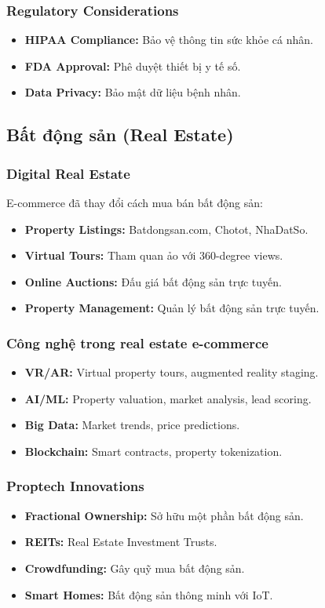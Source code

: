 \documentclass[a4paper,12pt]{report}
\begin{document}
\subsubsection{Regulatory Considerations}
\begin{itemize}
    \item \textbf{HIPAA Compliance:} Bảo vệ thông tin sức khỏe cá nhân.
    \item \textbf{FDA Approval:} Phê duyệt thiết bị y tế số.
    \item \textbf{Data Privacy:} Bảo mật dữ liệu bệnh nhân.
\end{itemize}

\subsection{Bất động sản (Real Estate)}

\subsubsection{Digital Real Estate}
E-commerce đã thay đổi cách mua bán bất động sản:
\begin{itemize}
    \item \textbf{Property Listings:} Batdongsan.com, Chotot, NhaDatSo.
    \item \textbf{Virtual Tours:} Tham quan ảo với 360-degree views.
    \item \textbf{Online Auctions:} Đấu giá bất động sản trực tuyến.
    \item \textbf{Property Management:} Quản lý bất động sản trực tuyến.
\end{itemize}

\subsubsection{Công nghệ trong real estate e-commerce}
\begin{itemize}
    \item \textbf{VR/AR:} Virtual property tours, augmented reality staging.
    \item \textbf{AI/ML:} Property valuation, market analysis, lead scoring.
    \item \textbf{Big Data:} Market trends, price predictions.
    \item \textbf{Blockchain:} Smart contracts, property tokenization.
\end{itemize}

\subsubsection{Proptech Innovations}
\begin{itemize}
    \item \textbf{Fractional Ownership:} Sở hữu một phần bất động sản.
    \item \textbf{REITs:} Real Estate Investment Trusts.
    \item \textbf{Crowdfunding:} Gây quỹ mua bất động sản.
    \item \textbf{Smart Homes:} Bất động sản thông minh với IoT.
\end{itemize}
\end{document}
